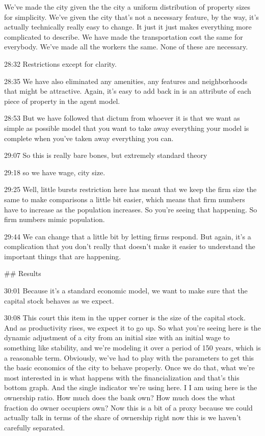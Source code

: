 We've made the city given the the city a uniform distribution of property sizes for simplicity. We've given the city that's not a necessary feature, by the way, it's actually technically really easy to change. It just it just makes everything more complicated to describe. We have made the transportation cost the same for everybody. We've made all the workers the same. None of these are necessary.

28:32
Restrictions except for clarity.

28:35
We have also eliminated any amenities, any features and neighborhoods that might be attractive. Again, it's easy to add back in is an attribute of each piece of property in the agent model.

28:53
But we have followed that dictum from whoever it is that we want as simple as possible model that you want to take away everything your model is complete when you've taken away everything you can.

29:07
So this is really bare bones, but extremely standard theory

29:18
so we have wage, city size.

29:25
Well, little bursts restriction here has meant that we keep the firm size the same to make comparisons a little bit easier, which means that firm numbers have to increase as the population increases. So you're seeing that happening. So firm numbers mimic population.

29:44
We can change that a little bit by letting firms respond. But again, it's a complication that you don't really that doesn't make it easier to understand the important things that are happening.


## Results

30:01
Because it's a standard economic model, we want to make sure that the capital stock behaves as we expect.

30:08
This court this item in the upper corner is the size of the capital stock. And as productivity rises, we expect it to go up. So what you're seeing here is the dynamic adjustment of a city from an initial size with an initial wage to something like stability, and we're modeling it over a period of 150 years, which is a reasonable term. Obviously, we've had to play with the parameters to get this the basic economics of the city to behave properly. Once we do that, what we're most interested in is what happens with the financialization and that's this bottom graph. And the single indicator we're using here. I I am using here is the ownership ratio. How much does the bank own? How much does the what fraction do owner occupiers own? Now this is a bit of a proxy because we could actually talk in terms of the share of ownership right now this is we haven't carefully separated.

